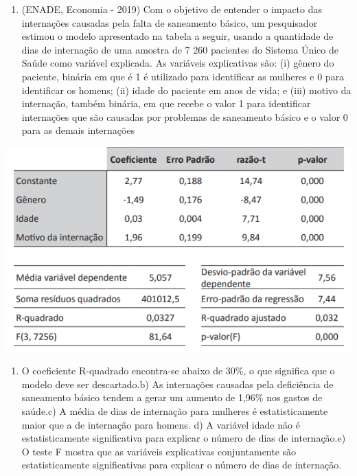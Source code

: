 \documentclass[
]{book}
\providecommand{\tightlist}{%
  \setlength{\itemsep}{0pt}\setlength{\parskip}{0pt}}
\begin{document}
\begin{enumerate}
\def\labelenumi{\arabic{enumi}.}
\tightlist
\item
  (ENADE, Economia - 2019) Com o objetivo de entender o impacto das internações causadas pela falta de saneamento básico, um pesquisador estimou o modelo apresentado na tabela a seguir, usando a quantidade de dias de internação de uma amostra de 7 260 pacientes do Sistema Único de Saúde como variável explicada. As variáveis explicativas são: (i) gênero do paciente, binária em que é 1 é utilizado para identificar as mulheres e 0 para identificar os homens; (ii) idade do paciente em anos de vida; e (iii) motivo da internação, também binária, em que recebe o valor 1 para identificar internações que são causadas por problemas de saneamento básico e o valor 0 para as demais internações
\end{enumerate}

\includegraphics{./img/exercicio_regressao.png}

\begin{enumerate}
\def\labelenumi{\alph{enumi})}
\tightlist
\item
  O coeficiente R-quadrado encontra-se abaixo de 30\%, o que significa que o modelo deve ser descartado.b) As internações causadas pela deficiência de saneamento básico tendem a gerar um aumento de 1,96\% nos gastos de saúde.c) A média de dias de internação para mulheres é estatisticamente maior que a de internação para homens. d) A variável idade não é estatisticamente significativa para explicar o número de dias de internação.e) O teste F mostra que as variáveis explicativas conjuntamente são estatisticamente significativas para explicar o número de dias de internação.\\
\end{enumerate}
\end{document}
